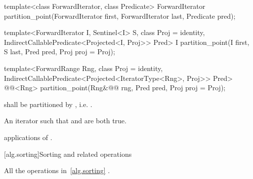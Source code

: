 %
\begin{removedblock}
\begin{itemdecl}
template<class ForwardIterator, class Predicate>
  ForwardIterator partition_point(ForwardIterator first,
                                  ForwardIterator last,
                                  Predicate pred);
\end{itemdecl}
\end{removedblock}
\begin{addedblock}
\begin{itemdecl}
template<ForwardIterator I, Sentinel<I> S, class Proj = identity,
    IndirectCallablePredicate<Projected<I, Proj>> Pred>
  I partition_point(I first, S last, Pred pred, Proj proj = Proj{});

template<ForwardRange Rng, class Proj = identity,
    IndirectCallablePredicate<Projected<IteratorType<Rng>, Proj>> Pred>
  @@<Rng>
    partition_point(Rng&@\newtxt{\&}@ rng, Pred pred, Proj proj = Proj{});
\end{itemdecl}
\end{addedblock}

\begin{itemdescr}
\pnum
\requires {} shall be partitioned by , i.e.
.

\pnum
\returns An iterator  such that  and
 are both true.

\pnum
\complexity {} applications of .
\end{itemdescr}


[alg.sorting]{Sorting and related operations}

\pnum
All the operations in~\ref{alg.sorting} .

